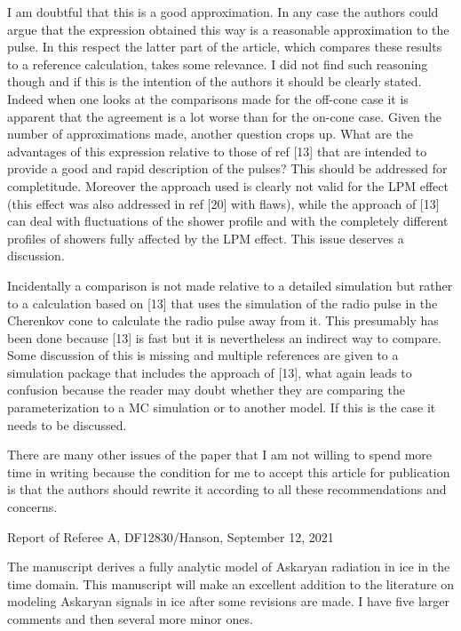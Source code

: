 \documentclass[12pt]{article}
\begin{document}
I am doubtful that this is a good approximation. In any case the authors could argue that the expression obtained this way is a reasonable approximation to the pulse. In this respect the latter part of the article, which compares these results to a reference calculation, takes some relevance. I did not find such reasoning though and if this is the intention of the authors it should be clearly stated. Indeed when one looks at the comparisons made for the off-cone case it is apparent that the agreement is a lot worse than for the on-cone case. Given the number of approximations made, another question crops up. What are the advantages of this expression relative to those of ref [13] that are intended to provide a good and rapid description of the pulses? This should be addressed for completitude.  Moreover the approach used is clearly not valid for the LPM effect (this effect was also addressed in ref [20] with flaws), while the approach of [13] can deal with fluctuations of the shower profile and with the completely different profiles of showers fully affected by the LPM effect. This issue deserves a discussion.  

Incidentally a comparison is not made relative to a detailed simulation but rather to a calculation based on [13] that uses the simulation of the radio pulse in the Cherenkov cone to calculate the radio pulse away from it. This presumably has been done because [13] is fast but it is nevertheless an indirect way to compare. Some discussion of this is missing and multiple references are given to a simulation package that includes the approach of [13], what again leads to confusion because the reader may doubt whether they are comparing the parameterization to a MC simulation or to another model. If this is the case it needs to be discussed.

There are many other issues of the paper that I am not willing to spend more time in writing because the condition for me to accept this article for publication is that the authors should rewrite it according to all these recommendations and concerns. \\ \vspace{0.25cm}

Report of Referee A, DF12830/Hanson, September 12, 2021  \\ \vspace{0.25cm}
\hrulefill

The manuscript derives a fully analytic model of Askaryan radiation in
ice in the time domain. This manuscript will make an excellent
addition to the literature on modeling Askaryan signals in ice after
some revisions are made. I have five larger comments and then several
more minor ones.
\end{document}
